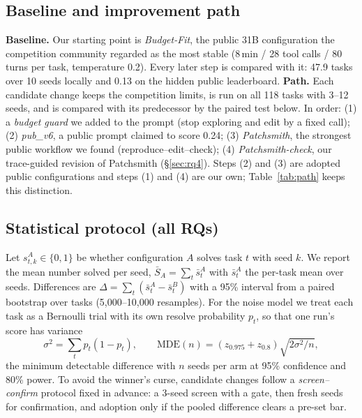 \documentclass[conference]{IEEEtran}
\begin{document}
\subsection{Baseline and improvement path}\label{sec:baseline}
\textbf{Baseline.} Our starting point is \emph{Budget-Fit}, the public 31B configuration the competition community regarded as the most stable (8\,min / 28 tool calls / 80 turns per task, temperature 0.2). Every later step is compared with it: 47.9 tasks over 10 seeds locally and 0.13 on the hidden public leaderboard. \textbf{Path.} Each candidate change keeps the competition limits, is run on all 118 tasks with 3--12 seeds, and is compared with its predecessor by the paired test below. In order: (1) a \emph{budget guard} we added to the prompt (stop exploring and edit by a fixed call); (2) \emph{pub\_v6}, a public prompt claimed to score 0.24; (3) \emph{Patchsmith}, the strongest public workflow we found (reproduce--edit--check); (4) \emph{Patchsmith-check}, our trace-guided revision of Patchsmith (§\ref{sec:rq4}). Steps (2) and (3) are adopted public configurations and steps (1) and (4) are our own; Table~\ref{tab:path} keeps this distinction.

\subsection{Statistical protocol (all RQs)}
Let $s^{A}_{t,k}\in\{0,1\}$ be whether configuration $A$ solves task $t$ with seed $k$. We report the mean number solved per seed, $\bar S_A = \sum_t \bar s^A_t$ with $\bar s^A_t$ the per-task mean over seeds. Differences are $\Delta = \sum_t(\bar s^A_t-\bar s^B_t)$ with a 95\% interval from a paired bootstrap over tasks (5,000--10,000 resamples). For the noise model we treat each task as a Bernoulli trial with its own resolve probability $p_t$, so that one run's score has variance
\begin{equation}
\sigma^2 = \sum_{t} p_t (1-p_t), \qquad \text{MDE}(n) = (z_{0.975}+z_{0.8})\sqrt{2\sigma^2/n},
\end{equation}
the minimum detectable difference with $n$ seeds per arm at 95\% confidence and 80\% power. To avoid the winner's curse, candidate changes follow a \emph{screen--confirm} protocol fixed in advance: a 3-seed screen with a gate, then fresh seeds for confirmation, and adoption only if the pooled difference clears a pre-set bar.
\end{document}
